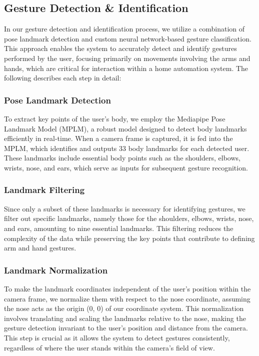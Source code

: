 \subsection{Gesture Detection \& Identification}

In our gesture detection and identification process, we utilize a combination of pose landmark detection and custom neural network-based gesture classification. This approach enables the system to accurately detect and identify gestures performed by the user, focusing primarily on movements involving the arms and hands, which are critical for interaction within a home automation system. The following describes each step in detail:

\subsubsection{Pose Landmark Detection}
To extract key points of the user's body, we employ the Mediapipe Pose Landmark Model (MPLM), a robust model designed to detect body landmarks efficiently in real-time. When a camera frame is captured, it is fed into the MPLM, which identifies and outputs 33 body landmarks for each detected user. These landmarks include essential body points such as the shoulders, elbows, wrists, nose, and ears, which serve as inputs for subsequent gesture recognition.

\subsubsection{Landmark Filtering}
Since only a subset of these landmarks is necessary for identifying gestures, we filter out specific landmarks, namely those for the shoulders, elbows, wrists, nose, and ears, amounting to nine essential landmarks. This filtering reduces the complexity of the data while preserving the key points that contribute to defining arm and hand gestures.

\subsubsection{Landmark Normalization}
To make the landmark coordinates independent of the user’s position within the camera frame, we normalize them with respect to the nose coordinate, assuming the nose acts as the origin (0, 0) of our coordinate system. This normalization involves translating and scaling the landmarks relative to the nose, making the gesture detection invariant to the user's position and distance from the camera. This step is crucial as it allows the system to detect gestures consistently, regardless of where the user stands within the camera’s field of view.

